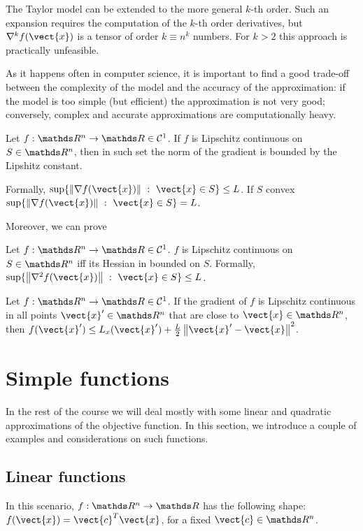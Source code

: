 \documentclass[computationalMathematics.tex]{subfiles}
\begin{document}
The Taylor model can be extended to the more general $k$-th order.
Such an expansion requires the computation of the  $k$-th order derivatives, but $\nabla^k f(\vect{x})$ is a tensor of order $k \equiv n^k$ numbers.
For $k > 2$ this approach is practically unfeasible.

As it happens often in computer science, it is important to find a good trade-off between the complexity of the model and the accuracy of the approximation: if the model is too simple (but efficient) the approximation is not very good; conversely, complex and accurate approximations are computationally heavy.

\begin{proposition}
  Let $f : \R^n \to \R \in \C{1}$.
  If $f$ is Lipschitz continuous on $S \in \R^n$, then in such set the norm of the gradient is bounded by the Lipshitz constant.
  
  Formally, $\sup \{\norm{\nabla f(\vect{x})}~:~\vect{x} \in S\} \leq L$.
  If $S$ convex  $\sup \{\norm{\nabla f(\vect{x})}~:~\vect{x} \in S\} = L$.
\end{proposition}

Moreover, we can prove

\begin{proposition}
Let $f : \R^n \to \R \in \C{1}$. $f$ is Lipschitz continuous on $S \in \R^n$ iff its Hessian in bounded on $S$.
Formally, $\sup \{\norm{\nabla^2 f(\vect{x})}~:~\vect{x} \in S\} \leq L$.
\end{proposition}

\begin{proposition}
  Let $f : \R^n \to \R \in \C{1}$.
  If the gradient of $f$ is Lipschitz continuous in all points $\vect{x}' \in \R^n$ that are close to $\vect{x} \in \R^n$, then $f(\vect{x}') \leq L_x(\vect{x}') + \frac{L}{2} \norm{\vect{x}' - \vect{x}}^2$.
\end{proposition}

\section{Simple functions}
In the rest of the course we will deal mostly with some linear and quadratic approximations of the objective function.
In this section, we introduce a couple of examples and considerations on such functions.

\subsection{Linear functions}
In this scenario, $f: \R^n \to \R$ has the following shape: $f(\vect{x}) = \tr{\vect{c}}\vect{x}$, for a fixed $\vect{c} \in \R^n$.
\end{document}
